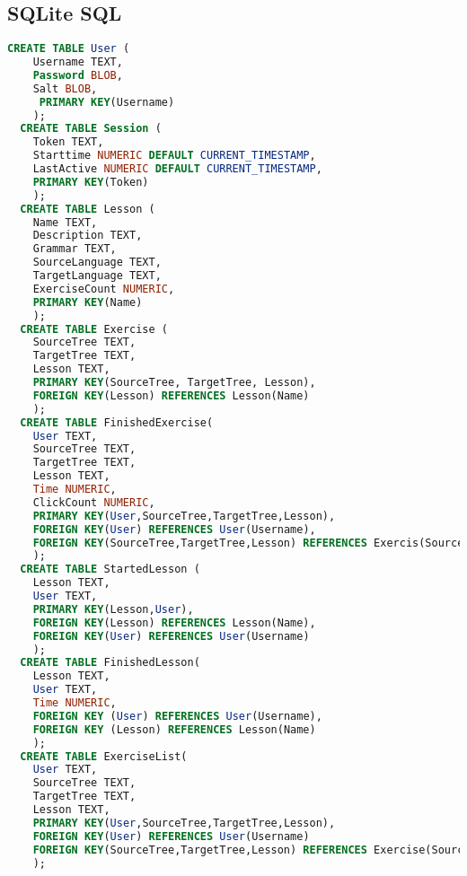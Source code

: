 \documentclass{scrartcl}
\begin{document}
\subsection{SQLite SQL}

\begin{lstlisting}[language=SQL]
  CREATE TABLE User (
    Username TEXT,
    Password BLOB,
    Salt BLOB,
     PRIMARY KEY(Username)
    );
  CREATE TABLE Session (
    Token TEXT,
    Starttime NUMERIC DEFAULT CURRENT_TIMESTAMP,
    LastActive NUMERIC DEFAULT CURRENT_TIMESTAMP,
    PRIMARY KEY(Token)
    );
  CREATE TABLE Lesson (
    Name TEXT,
    Description TEXT,
    Grammar TEXT,
    SourceLanguage TEXT,
    TargetLanguage TEXT,
    ExerciseCount NUMERIC,
    PRIMARY KEY(Name)
    );
  CREATE TABLE Exercise (
    SourceTree TEXT,
    TargetTree TEXT,
    Lesson TEXT,
    PRIMARY KEY(SourceTree, TargetTree, Lesson),
    FOREIGN KEY(Lesson) REFERENCES Lesson(Name)
    );
  CREATE TABLE FinishedExercise(
    User TEXT,
    SourceTree TEXT,
    TargetTree TEXT,
    Lesson TEXT,
    Time NUMERIC,
    ClickCount NUMERIC,
    PRIMARY KEY(User,SourceTree,TargetTree,Lesson),
    FOREIGN KEY(User) REFERENCES User(Username),
    FOREIGN KEY(SourceTree,TargetTree,Lesson) REFERENCES Exercis(SourceTree,TargetTree,Lesson)
    );
  CREATE TABLE StartedLesson (
    Lesson TEXT,
    User TEXT,
    PRIMARY KEY(Lesson,User),
    FOREIGN KEY(Lesson) REFERENCES Lesson(Name),
    FOREIGN KEY(User) REFERENCES User(Username)
    );
  CREATE TABLE FinishedLesson(
    Lesson TEXT,
    User TEXT,
    Time NUMERIC,
    FOREIGN KEY (User) REFERENCES User(Username),
    FOREIGN KEY (Lesson) REFERENCES Lesson(Name)
    );
  CREATE TABLE ExerciseList(
    User TEXT,
    SourceTree TEXT,
    TargetTree TEXT,
    Lesson TEXT,
    PRIMARY KEY(User,SourceTree,TargetTree,Lesson),
    FOREIGN KEY(User) REFERENCES User(Username)
    FOREIGN KEY(SourceTree,TargetTree,Lesson) REFERENCES Exercise(SourceTree,TargetTree,Lesson)
    );
\end{lstlisting}
\end{document}
